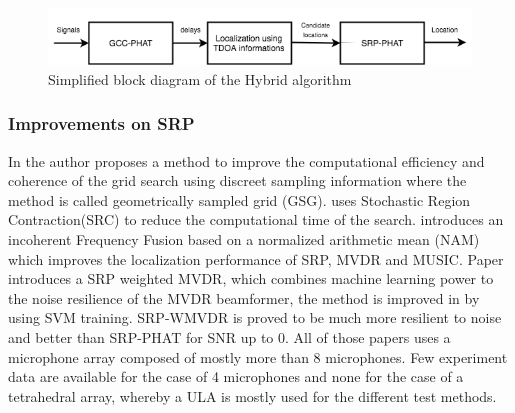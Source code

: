 \begin{figure}[H]
    \centering
    \includegraphics[width=1\textwidth]{Figures/hybridalgo.png}
    \caption{Simplified block diagram of the Hybrid algorithm}
    \label{fig:hybridalgo}
\end{figure}

\subsubsection{Improvements on SRP}

In \cite{salvati2017exploiting} the author proposes a method to improve the computational efficiency and coherence of the grid search using discreet sampling information where the method is called geometrically sampled grid (GSG). \cite{do2007real} uses Stochastic Region Contraction(SRC) to reduce the computational time of the search. \cite{salvati2014incoherent} introduces an incoherent Frequency Fusion based on a normalized arithmetic mean (NAM) which improves the localization performance of SRP, MVDR and MUSIC. Paper \cite{salvati2015frequency} introduces a SRP weighted MVDR, which combines machine learning power to the noise resilience of the MVDR beamformer, the method is improved in \cite{salvati2016use} by using SVM training. SRP-WMVDR is proved to be much more resilient to noise and better than SRP-PHAT for SNR up to 0. All of those papers uses a microphone array composed of mostly more than 8 microphones. Few experiment data are available for the case of 4 microphones and none for the case of a tetrahedral array, whereby a ULA is mostly used for the different test methods.


